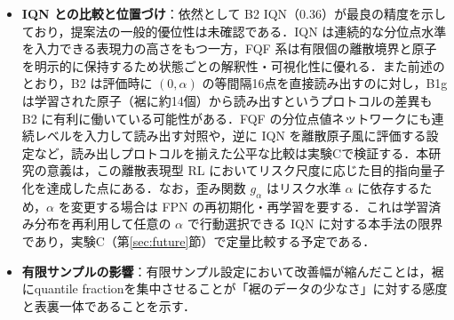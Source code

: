 \documentclass[a4paper,10pt]{jsarticle}
\theoremstyle{definition}
\begin{document}
\begin{itemize}
  \item \textbf{IQN との比較と位置づけ}：依然として B2 IQN（0.36）が最良の精度を示しており，提案法の一般的優位性は未確認である．IQN は連続的な分位点水準を入力できる表現力の高さをもつ一方，FQF 系は有限個の離散境界と原子を明示的に保持するため状態ごとの解釈性・可視化性に優れる．また前述のとおり，B2 は評価時に $(0,\alpha)$ の等間隔16点を直接読み出すのに対し，B1g は学習された原子（裾に約14個）から読み出すというプロトコルの差異も B2 に有利に働いている可能性がある．FQF の分位点値ネットワークにも連続レベルを入力して読み出す対照や，逆に IQN を離散原子風に評価する設定など，読み出しプロトコルを揃えた公平な比較は実験Cで検証する．本研究の意義は，この離散表現型 RL においてリスク尺度に応じた目的指向量子化を達成した点にある．なお，歪み関数 $g_\alpha$ はリスク水準 $\alpha$ に依存するため，$\alpha$ を変更する場合は FPN の再初期化・再学習を要する．これは学習済み分布を再利用して任意の $\alpha$ で行動選択できる IQN に対する本手法の限界であり，実験C（第\ref{sec:future}節）で定量比較する予定である．
  \item \textbf{有限サンプルの影響}：有限サンプル設定において改善幅が縮んだことは，裾にquantile fractionを集中させることが「裾のデータの少なさ」に対する感度と表裏一体であることを示す．
\end{itemize}
\end{document}
